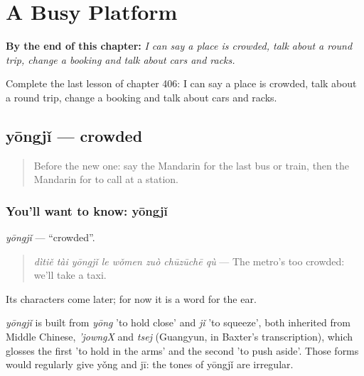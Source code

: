 
\chapter{A Busy Platform}
\label{ch:zh-a-busy-platform}

\begin{chapteropening}
\textbf{By the end of this chapter:} \emph{I can say a place is crowded, talk about a round trip, change a booking and talk about cars and racks.}

Complete the last lesson of chapter 406: I can say a place is crowded, talk about a round trip, change a booking and talk about cars and racks.
\end{chapteropening}

\section[yōngjǐ]{yōngjǐ — crowded}

\label{lesson:ZH-C406-yongji}



\begin{quote}
Before the new one: say the Mandarin for the last bus or train, then the Mandarin for to call at a station.
\end{quote}

\subsection*{You'll want to know: yōngjǐ}
\emph{yōngjǐ} — \textquotedblleft{}crowded\textquotedblright{}.

\begin{quote}
\emph{dìtiě tài yōngjǐ le wǒmen zuò chūzūchē qù} — The metro's too crowded: we'll take a taxi.
\end{quote}

Its characters come later; for now it is a word for the ear.

\begin{cousinweb}
\emph{yōngjǐ} is built from \emph{yōng} 'to hold close' and \emph{jǐ} 'to squeeze', both inherited from Middle Chinese, \emph{'jowngX} and \emph{tsej} (Guangyun, in Baxter's transcription), which glosses the first 'to hold in the arms' and the second 'to push aside'. Those forms would regularly give yǒng and jī: the tones of yōngjǐ are irregular.
\end{cousinweb}

